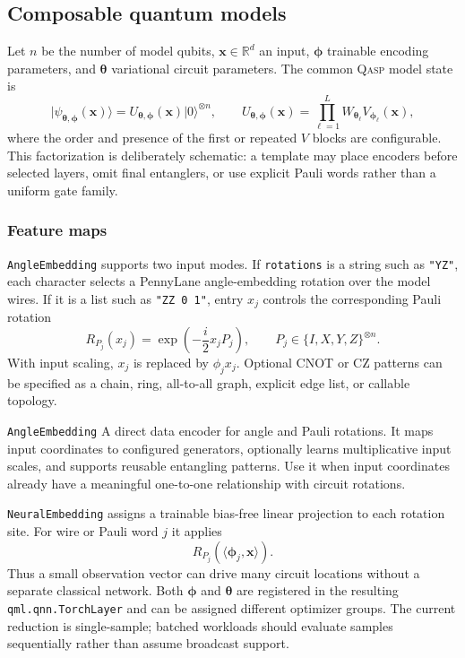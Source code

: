 \documentclass[10pt]{article}
\newcommand{\qasp}{\textsc{Qasp}}
\newcommand{\code}[1]{\texttt{#1}}
\newcommand{\R}{\mathbb{R}}
\begin{document}
\subsection{Composable quantum models}
\label{sec:models}

Let $n$ be the number of model qubits, $\bm{x}\in\R^d$ an input, $\bm{\phi}$ trainable encoding parameters, and $\bm{\theta}$ variational circuit parameters.  The common \qasp{} model state is
\begin{equation}
  \lvert\psi_{\bm{\theta},\bm{\phi}}(\bm{x})\rangle
  = U_{\bm{\theta},\bm{\phi}}(\bm{x})\lvert 0\rangle^{\otimes n},
  \qquad
  U_{\bm{\theta},\bm{\phi}}(\bm{x})
  = \prod_{\ell=1}^{L} W_{\bm{\theta}_{\ell}}V_{\bm{\phi}_{\ell}}(\bm{x}),
  \label{eq:model}
\end{equation}
where the order and presence of the first or repeated $V$ blocks are configurable.  This factorization is deliberately schematic: a template may place encoders before selected layers, omit final entanglers, or use explicit Pauli words rather than a uniform gate family.

\subsubsection{Feature maps}

\code{AngleEmbedding} supports two input modes.  If \code{rotations} is a string such as \code{"YZ"}, each character selects a PennyLane angle-embedding rotation over the model wires.  If it is a list such as \code{"ZZ 0 1"}, entry $x_j$ controls the corresponding Pauli rotation
\begin{equation}
  R_{P_j}(x_j)=\exp\!\left(-\frac{i}{2}x_jP_j\right),
  \qquad P_j\in\{I,X,Y,Z\}^{\otimes n}.
\end{equation}
With input scaling, $x_j$ is replaced by $\phi_jx_j$.  Optional CNOT or CZ patterns can be specified as a chain, ring, all-to-all graph, explicit edge list, or callable topology.

\begin{qaspfeature}{\code{AngleEmbedding}}
A direct data encoder for angle and Pauli rotations.  It maps input coordinates
to configured generators, optionally learns multiplicative input scales, and
supports reusable entangling patterns.  Use it when input coordinates already
have a meaningful one-to-one relationship with circuit rotations.
\end{qaspfeature}

\code{NeuralEmbedding} assigns a trainable bias-free linear projection to each
rotation site.  For wire or Pauli word $j$ it applies
\begin{equation}
  R_{P_j}\!\left(\langle\bm{\phi}_j,\bm{x}\rangle\right).
  \label{eq:neural_embedding}
\end{equation}
Thus a small observation vector can drive many circuit locations without a
separate classical network.  Both $\bm{\phi}$ and $\bm{\theta}$ are registered
in the resulting \code{qml.qnn.TorchLayer} and can be assigned different
optimizer groups.  The current reduction is single-sample; batched workloads
should evaluate samples sequentially rather than assume broadcast support.
\end{document}
